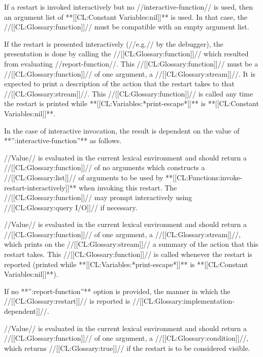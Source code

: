 If a restart is invoked interactively but no //interactive-function// is used, then an argument list of **[[CL:Constant Variables:nil]]** is used. In that case, the //[[CL:Glossary:function]]// must be compatible with an empty argument list.

If the restart is presented interactively (//e.g.// by the debugger), the presentation is done by calling the //[[CL:Glossary:function]]// which resulted from evaluating //report-function//. This //[[CL:Glossary:function]]// must be a //[[CL:Glossary:function]]// of one argument, a //[[CL:Glossary:stream]]//. It is expected to print a description of the action that the restart takes to that //[[CL:Glossary:stream]]//. This //[[CL:Glossary:function]]// is called any time the restart is printed while **[[CL:Variables:*print-escape*]]** is **[[CL:Constant Variables:nil]]**.

In the case of interactive invocation, the result is dependent on the value of **'':interactive-function''** as follows.

\beginlist {}

//Value// is evaluated in the current lexical environment and should return a //[[CL:Glossary:function]]// of no arguments which constructs a //[[CL:Glossary:list]]// of arguments to be used by **[[CL:Functions:invoke-restart-interactively]]** when invoking this restart. The //[[CL:Glossary:function]]// may prompt interactively using //[[CL:Glossary:query I/O]]// if necessary.


//Value// is evaluated in the current lexical environment and should return a //[[CL:Glossary:function]]// of one argument, a //[[CL:Glossary:stream]]//, which prints on the //[[CL:Glossary:stream]]// a summary of the action that this restart takes. This //[[CL:Glossary:function]]// is called whenever the restart is reported (printed while **[[CL:Variables:*print-escape*]]** is **[[CL:Constant Variables:nil]]**).

If no **'':report-function''** option is provided, the manner in which the //[[CL:Glossary:restart]]// is reported is //[[CL:Glossary:implementation-dependent]]//.


//Value// is evaluated in the current lexical environment and should return a //[[CL:Glossary:function]]// of one argument, a //[[CL:Glossary:condition]]//, which returns //[[CL:Glossary:true]]// if the restart is to be considered visible.

